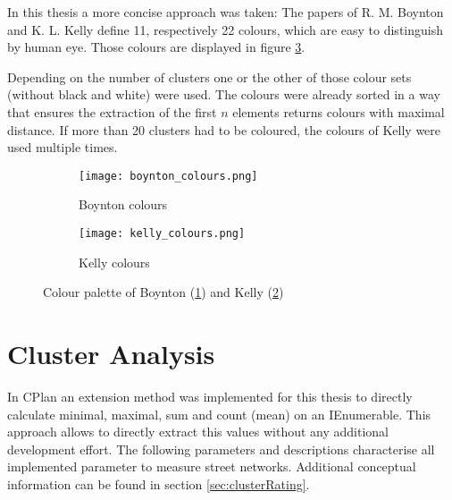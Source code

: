 In this thesis a more concise approach was taken: The papers of R. M. Boynton \cite{boynton:1989} and K. L. Kelly \cite{kelly:1965} define 11, respectively 22 colours, which are easy to distinguish by human eye. Those colours are displayed in figure \ref{fig:colours}.

Depending on the number of clusters one or the other of those colour sets (without black and white) were used. The colours were already sorted in a way that ensures the extraction of the first $n$ elements returns colours with maximal distance. If more than 20 clusters had to be coloured, the colours of Kelly were used multiple times.

\begin{figure}
    \centering
    \begin{subfigure}[b]{\textwidth}
        \begin{mdframed}[style=mdthight]
            \texttt{[image: boynton\_colours.png]}
        \end{mdframed}
        \caption{Boynton colours}
        \label{fig:boynton_colours}
    \end{subfigure}
    \par\medskip
    \begin{subfigure}[b]{\textwidth}
        \begin{mdframed}[style=mdthight]
            \texttt{[image: kelly\_colours.png]}
        \end{mdframed}
        \caption{Kelly colours}
        \label{fig:kelly_colurs}
    \end{subfigure}
    \caption{Colour palette of Boynton (\ref{fig:boynton_colours}) and Kelly (\ref{fig:kelly_colurs})}
    \label{fig:colours}
\end{figure}

\FloatBarrier
\pagebreak
\section{Cluster Analysis}
\label{sec:cluster_analysis_impl}
In CPlan an extension method was implemented for this thesis to directly calculate minimal, maximal, sum and count (mean) on an IEnumerable. This approach allows to directly extract this values without any additional development effort. The following parameters and descriptions characterise all implemented parameter to measure street networks. Additional conceptual information can be found in section \ref{sec:clusterRating}.


